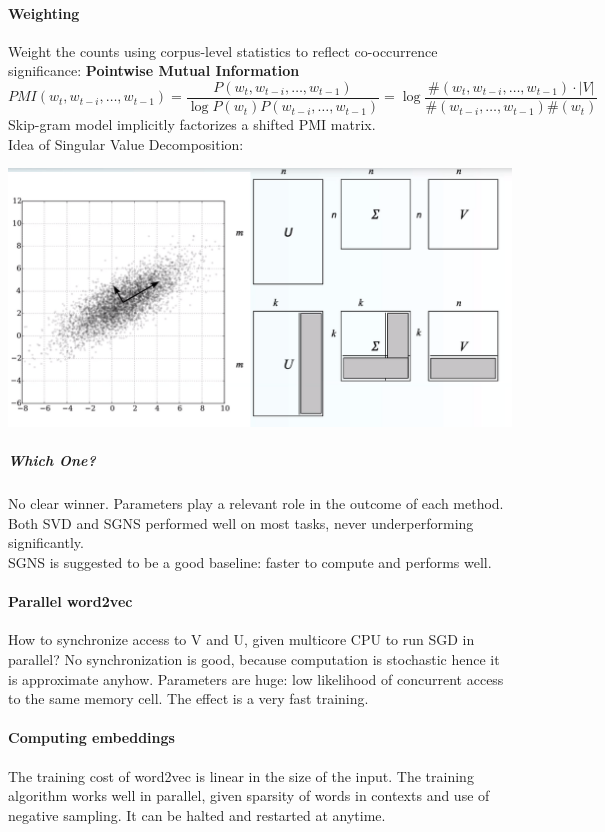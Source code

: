 \documentclass[10pt]{report}
\begin{document}
\paragraph{Weighting} Weight the counts using corpus-level statistics to reflect co-occurrence significance: \textbf{Pointwise Mutual Information} $$ PMI(w_t,w_{t-i},\ldots,w_{t-1}) = \frac{P(w_t,w_{t-i},\ldots,w_{t-1})}{\log P(w_t)P(w_{t-i},\ldots,w_{t-1})} = \log\frac{\#(w_t,w_{t-i},\ldots,w_{t-1})\cdot|V|}{\#(w_{t-i},\ldots,w_{t-1})\#(w_t)}$$
Skip-gram model implicitly factorizes a shifted PMI matrix.\\
Idea of Singular Value Decomposition:
\begin{center}
	\includegraphics[scale=0.5]{6.png}
\end{center}
\subparagraph{Which One?} No clear winner. Parameters play a relevant role in the outcome of each method. Both SVD and SGNS performed well on most tasks, never underperforming significantly.\\
SGNS is suggested to be a good baseline: faster to compute and performs well.
\paragraph{Parallel word2vec} How to synchronize access to V and U, given multicore CPU to run SGD in parallel? No synchronization is good, because computation is stochastic hence it is approximate anyhow. Parameters are huge: low likelihood of concurrent access to the same memory cell. The effect is a very fast training.
\paragraph{Computing embeddings} The training cost of word2vec is linear in the size of the input. The training algorithm works well in parallel, given sparsity of words in contexts and use of negative sampling. It can be halted and restarted at anytime. %
\end{document}
